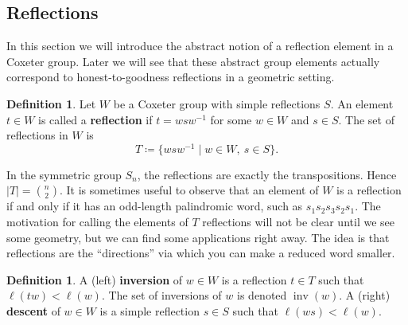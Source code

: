\documentclass{article}
\numberwithin{equation}{section}
\newcommand{\newword}[1]{\textbf{#1}}
\theoremstyle{remark}
\theoremstyle{definition}
\newtheorem{definition}[theorem]{Definition}
\begin{document}
	\subsection{Reflections}
	\newcommand{\inv}{\operatorname{inv}}
	In this section we will introduce the abstract notion of a reflection element in a Coxeter group. Later we will see that these abstract group elements actually correspond to honest-to-goodness reflections in a geometric setting.
	
	\begin{definition}
		Let $W$ be a Coxeter group with simple reflections $S$. An element $t\in W$ is called a \newword{reflection} if $t = wsw^{-1}$ for some $w\in W$ and $s\in S$. The set of reflections in $W$ is
		\[ T\coloneqq \{wsw^{-1} \mid w\in W, ~s\in S\}. \]
	\end{definition}
	
	In the symmetric group $S_n$, the reflections are exactly the transpositions. Hence $|T|=\binom{n}{2}$. It is sometimes useful to observe that an element of $W$ is a reflection if and only if it has an odd-length palindromic word, such as $s_1s_2s_3s_2s_1$. 
	The motivation for calling the elements of $T$ reflections will not be clear until we see some geometry, but we can find some applications right away. The idea is that reflections are the ``directions'' via which you can make a reduced word smaller. 
	
	\begin{definition}
		A (left) \newword{inversion} of $w\in W$ is a reflection $t\in T$ such that $\ell(tw) < \ell(w)$. The set of inversions of $w$ is denoted $\inv(w)$.  
		A (right) \newword{descent} of $w\in W$ is a simple reflection $s\in S$ such that $\ell(ws)<\ell(w)$. 
	\end{definition}
	
\end{document}
